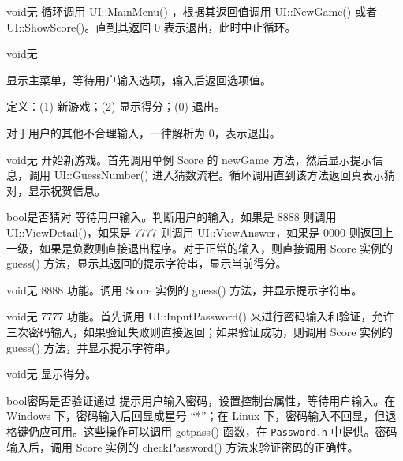 {}
{void}{无}
{循环调用 UI::MainMenu() ，根据其返回值调用 UI::NewGame() 或者 UI::ShowScore()。直到其返回 0 表示退出，此时中止循环。}

{}
{void}{无}
{显示主菜单，等待用户输入选项，输入后返回选项值。

定义：(1) 新游戏；(2) 显示得分；(0) 退出。

对于用户的其他不合理输入，一律解析为 0，表示退出。}

{}
{void}{无}
{开始新游戏。首先调用单例 Score 的 newGame 方法，然后显示提示信息，调用 UI::GuessNumber() 进入猜数流程。循环调用直到该方法返回真表示猜对，显示祝贺信息。}

{}
{bool}{是否猜对}
{等待用户输入。判断用户的输入，如果是 8888 则调用 UI::ViewDetail()，如果是 7777 则调用 UI::ViewAnswer，如果是 0000 则返回上一级，如果是负数则直接退出程序。对于正常的输入，则直接调用 Score 实例的 guess() 方法，显示其返回的提示字符串，显示当前得分。}

{}
{void}{无}
{8888 功能。调用 Score 实例的 guess() 方法，并显示提示字符串。}

{}
{void}{无}
{7777 功能。首先调用 UI::InputPassword() 来进行密码输入和验证，允许三次密码输入，如果验证失败则直接返回；如果验证成功，则调用 Score 实例的 guess() 方法，并显示提示字符串。}

{}
{void}{无}
{显示得分。}

{}
{bool}{密码是否验证通过}
{提示用户输入密码，设置控制台属性，等待用户输入。在 Windows 下，密码输入后回显成星号 “*”；在 Linux 下，密码输入不回显，但退格键仍应可用。这些操作可以调用 getpass() 函数，在 {\tt Password.h} 中提供。密码输入后，调用 Score 实例的 checkPassword() 方法来验证密码的正确性。}

















